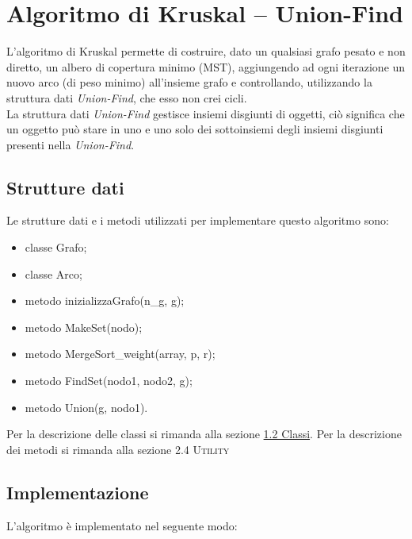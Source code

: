 \section{Algoritmo di Kruskal -- Union-Find}
\label{Algoritmo_di_Kruskal_Union-Find}

L'algoritmo di Kruskal permette di costruire, dato un qualsiasi grafo pesato e non diretto, un albero di copertura minimo (MST), aggiungendo ad ogni iterazione un nuovo arco (di peso minimo) all'insieme grafo e controllando, utilizzando la struttura dati \textit{Union-Find}, che esso non crei cicli. \\
La struttura dati \textit{Union-Find} gestisce insiemi disgiunti di oggetti, ciò significa che un oggetto può stare in uno e uno solo dei sottoinsiemi degli insiemi disgiunti presenti nella \textit{Union-Find}.

\subsection{Strutture dati}
\label{strutture_dati}

Le strutture dati e i metodi utilizzati per implementare questo algoritmo sono:

\begin{itemize}
    \item classe Grafo;
    \item classe Arco;
    \item metodo inizializzaGrafo(n\_g, g);
    \item metodo MakeSet(nodo);
    \item metodo MergeSort\_weight(array, p, r);
    \item metodo FindSet(nodo1, nodo2, g);
    \item metodo Union(g, nodo1).
\end{itemize}

Per la descrizione delle classi si rimanda alla sezione \hyperlink{subsection.1.2}{1.2 Classi}.
\newline
Per la descrizione dei metodi si rimanda alla sezione \textsc{2.4 Utility}

\subsection{Implementazione}
\label{implementazione}

L'algoritmo è implementato nel seguente modo:

